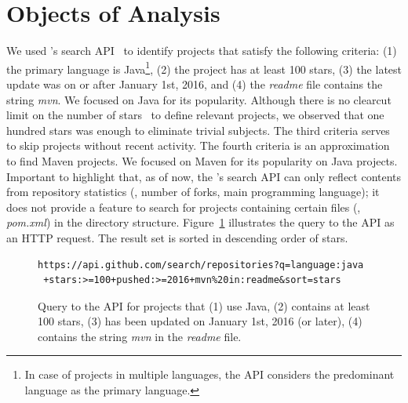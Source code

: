 \section{Objects of Analysis}
\label{sec:subjects}

We used \github{}'s search API~\cite{githubsearch} to identify
projects that satisfy the following criteria: (1) the primary language
is Java\footnote{In case of projects in multiple languages, the
  \github{} API considers the predominant language as the primary
  language.}, (2) the project has at least 100 stars, (3) the latest
update was on or after January 1st, 2016, and (4) the \emph{readme}
file contains the string \emph{mvn}.  We focused on Java for its
popularity.  Although there is no clearcut limit on the number of
\github{} stars~\cite{github-stars} to define relevant projects, we
observed that one hundred stars was enough to eliminate trivial subjects. The third
criteria serves to skip projects without recent activity. The fourth
criteria is an approximation to find Maven projects. We focused on Maven for its popularity on
Java projects.  Important to highlight that, as of now, the
\github{}'s search API can only reflect contents from repository
statistics (\eg, number of forks, main programming language); it does
not provide a feature to search for projects containing certain files
(\eg{}, \emph{pom.xml}) in the directory structure.
Figure~\ref{fig:subject-query} illustrates the query to the \github{}
API as an HTTP request.   The result set is sorted
in descending order of stars.


\vspace{1ex}
\begin{figure}[t!]
\centering
\scriptsize
{}
\begin{lstlisting}
https://api.github.com/search/repositories?q=language:java
 +stars:>=100+pushed:>=2016+mvn%20in:readme&sort=stars
\end{lstlisting}
  \caption{\label{fig:subject-query} Query to the \github{} API for
  projects that (1) use Java, (2) contains at least 100
  stars, (3) has been updated on January 1st, 2016 (or later), (4) contains
  the string \emph{mvn} in the \emph{readme} file.}
  \vspace{-5ex}  
\end{figure}

